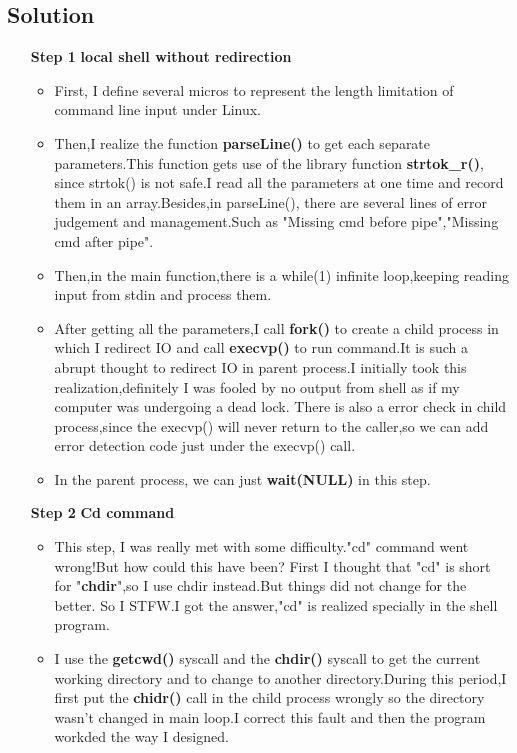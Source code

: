 \documentclass[]{article}
\begin{document}
\subsection*{Solution}
        \begin{enumerate}
            \item [\textbf{Step 1}] \textbf{local shell without redirection}
            \begin{itemize}
                \item First, I define several micros to represent the length limitation of command line input under Linux.
                \item Then,I realize the function \textbf{parseLine()} to get each separate parameters.This function gets use of the library function \textbf{strtok\_r()},
                since strtok() is not safe.I read all the parameters at one time and record them in an array.Besides,in parseLine(), there are several lines of error judgement and management.Such as "Missing cmd before pipe","Missing cmd after pipe".
                \item Then,in the main function,there is a while(1) infinite loop,keeping reading input from stdin and process them.
                \item After getting all the parameters,I call \textbf{fork()} to create a child process in which I redirect IO and call \textbf{execvp()} to run command.It is such a abrupt thought to redirect IO in parent process.I initially took this realization,definitely I was fooled by no output from shell as if my computer was undergoing a dead lock.
                There is also a error check in child process,since the execvp() will never return to the caller,so we can add error detection code just under the execvp() call.
                \item In the parent process, we can just \textbf{wait(NULL)} in this step.
            \end{itemize}
            
            \item[\textbf{Step 2}] \textbf{Cd command}
            \begin{itemize}
                \item This step, I was really met with some difficulty."cd" command went wrong!But how could this have been?
                First I thought that "cd" is short for "\textbf{chdir}",so I use chdir instead.But things did not change for the better.
                So I STFW.I got the answer,"cd" is realized specially in the shell program.
                \item I use the \textbf{getcwd()} syscall and the \textbf{chdir()} syscall to get the current working
                directory and to change to another directory.During this period,I first put the \textbf{chidr()} call
                in the child process wrongly so the directory wasn't changed in main loop.I correct this fault and then the 
                program workded the way I designed.\par 
            \end{itemize}


\end{enumerate}
\end{document}
